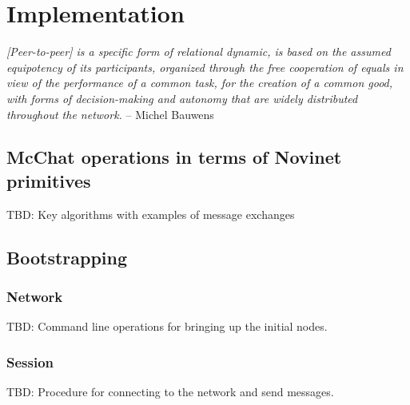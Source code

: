 \chapter{Implementation}



\textit{[Peer-to-peer] is a specific form of relational dynamic, is based on the assumed equipotency of its participants, organized through the free cooperation of equals in view of the performance of a common task, for the creation of a common good, with forms of decision-making and autonomy that are widely distributed throughout the network.} -- Michel Bauwens~\cite{p2pfoundation:definition}

	
\section{McChat operations in terms of Novinet primitives}

TBD: Key algorithms with examples of message exchanges

\section{Bootstrapping}

\subsection{Network}

TBD: Command line operations for bringing up the initial nodes.

\subsection{Session}

TBD: Procedure for connecting to the network and send messages.

